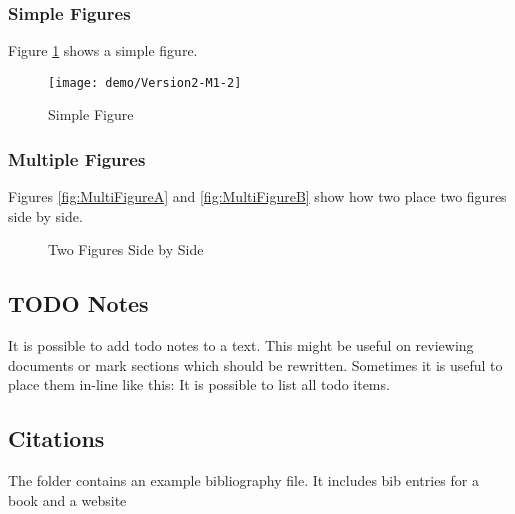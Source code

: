 \subsubsection{Simple Figures}
%
Figure \ref{fig:SimpleFigure} shows a simple figure.
%
\begin{figure}[htb]
	\begin{center}
		\texttt{[image: demo/Version2-M1-2]}
		\caption{Simple Figure}
		\label{fig:SimpleFigure}
	\end{center}
\end{figure}
%
%
\subsubsection{Multiple Figures}
%
Figures \ref{fig:MultiFigureA} and \ref{fig:MultiFigureB} show how two place 
two figures side by side.
%
\begin{figure}[htb]
	\begin{center}
		\caption{Two Figures Side by Side}
	\end{center}
\end{figure}
%
\subsection{TODO Notes}
%
It is possible to add todo notes to a text.
This might be useful on reviewing documents or mark sections
which should be rewritten.
Sometimes it is useful to place them in-line like this:
%
It is possible to list all todo items.
\listoftodos
%
\subsection{Citations}
%
The  folder contains an example bibliography file.
It includes bib entries for a book\cite{LatexBook} and
a website\cite{LatexWebsite}
%

